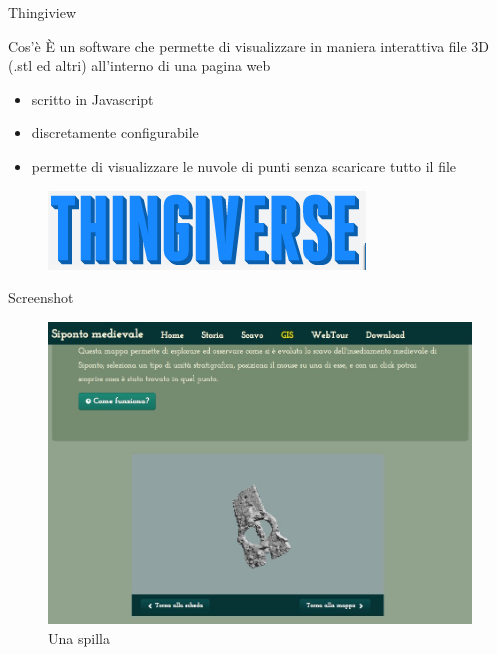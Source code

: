 \documentclass{beamer}
\begin{document}
		\begin{frame}{Thingiview}
			\begin{block}{Cos'è}
				È un software che permette di visualizzare in maniera interattiva file 3D (.stl ed altri) all'interno di una pagina web
			\end{block}
			\begin{multicols}{2}[][]
				\begin{itemize}
					\item scritto in Javascript
					\item discretamente configurabile
					\item permette di visualizzare le nuvole di punti senza scaricare tutto il file
				\end{itemize}
				\columnbreak
				\begin{figure}[]
					\begin{center}
						\includegraphics[width=1\linewidth]{sw_logos/thingiview}
					\end{center}
					\label{fig:thingi}
				\end{figure}
			\end{multicols}
		\end{frame}

		\begin{frame}{Screenshot}
			\begin{figure}[]
				\begin{center}
					\includegraphics[width=1\linewidth]{screen_3d}
				\end{center}
				\caption{Una spilla }
			\end{figure}
		\end{frame}
\end{document}
